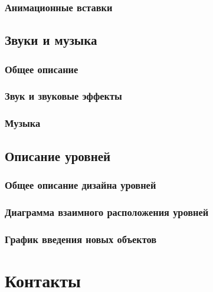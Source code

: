 \documentclass{article}
\begin{document}
        \subsubsection{Анимационные вставки}
    \subsection{Звуки и музыка}
        \subsubsection{Общее описание}
        \subsubsection{Звук и звуковые эффекты}
        \subsubsection{Музыка}
    \subsection{Описание уровней}
        \subsubsection{Общее описание дизайна уровней}
        \subsubsection{Диаграмма взаимного расположения уровней}
        \subsubsection{График введения новых объектов}

\section{Контакты}

\newpage
\end{document}
